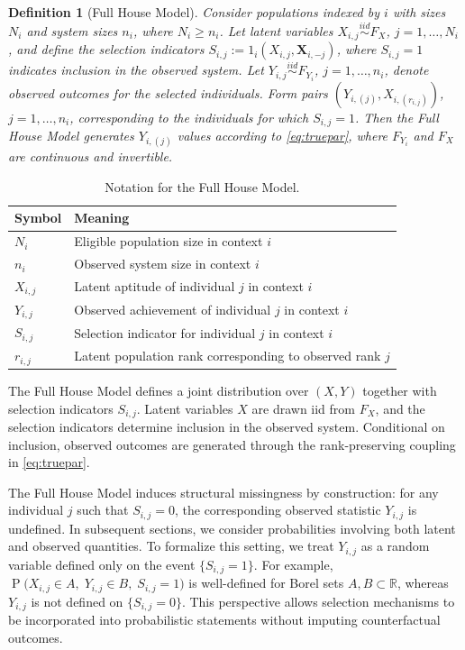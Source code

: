 \documentclass[12pt]{article}
\DeclareMathOperator*{\Prob}{P}
\newtheorem{defn}[theorem]{Definition}
\begin{document}
\begin{defn} [Full House Model]
\label{def:fhm}
Consider populations indexed by $i$ with sizes $N_i$ and system sizes $n_i$, where $N_i \geq n_i$. Let latent variables $X_{i,j} \overset{iid}{\sim} F_X$, $j = 1,\ldots,N_i$, and define the selection indicators $S_{i,j} := 1_i(X_{i,j}, \mathbf{X}_{i,-j})$, where $S_{i,j}=1$ indicates inclusion in the observed system. Let $Y_{i,j} \overset{iid}{\sim} F_{Y_i}$, $j = 1,\ldots,n_i$, denote observed outcomes for the selected individuals. Form pairs $(Y_{i,(j)}, X_{i,(r_{i,j})})$, $j = 1,\ldots,n_i$, corresponding to the individuals for which $S_{i,j}=1$. Then the Full House Model generates $Y_{i,(j)}$ values according to \eqref{eq:truepar}, where $F_{Y_i}$ and $F_X$ are continuous and invertible.
\end{defn}



\begin{table}
\centering
\begin{tabular}{ll}
\hline
Symbol & Meaning \\
\hline
$N_i$ & Eligible population size in context $i$ \\
$n_i$ & Observed system size in context $i$ \\
$X_{i,j}$ & Latent aptitude of individual $j$ in context $i$ \\
$Y_{i,j}$ & Observed achievement of individual $j$ in context $i$ \\
$S_{i,j}$ & Selection indicator for individual $j$ in context $i$ \\
$r_{i,j}$ & Latent population rank corresponding to observed rank $j$ \\
\hline
\end{tabular}
\caption{Notation for the Full House Model.}
\label{tab:notation}
\end{table}



The Full House Model defines a joint distribution over $(X,Y)$ together with selection indicators $S_{i,j}$. Latent variables $X$ are drawn iid from $F_X$, and the selection indicators determine inclusion in the observed system. Conditional on inclusion, observed outcomes are generated through the rank-preserving coupling in \eqref{eq:truepar}.

The Full House Model induces structural missingness by construction: for any individual $j$ such that $S_{i,j} = 0$, the corresponding observed statistic $Y_{i,j}$ is undefined. In subsequent sections, we consider probabilities involving both latent and observed quantities. To formalize this setting, we treat $Y_{i,j}$ as a random variable defined only on the event $\{S_{i,j}=1\}$. For example, $\Prob\big(X_{i,j}\in A,\; Y_{i,j}\in B,\; S_{i,j} = 1\big)$ is well-defined for Borel sets \(A,B\subset \mathbb R\), whereas $Y_{i,j}$ is not defined on $\{S_{i,j} = 0\}$. This perspective allows selection mechanisms to be incorporated into probabilistic statements without imputing counterfactual outcomes.
\end{document}
